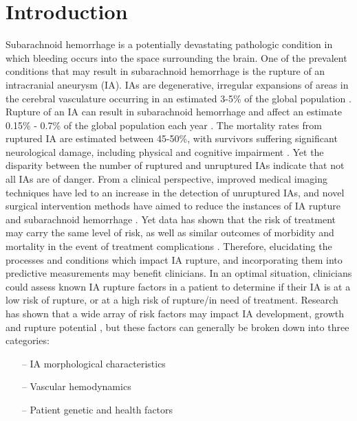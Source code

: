 \cleartooddpage[\thispagestyle{empty}]
\chapter{Introduction}\label{CHAPTER1}

Subarachnoid hemorrhage is a potentially devastating pathologic condition in which bleeding occurs into the space surrounding the brain. One of the prevalent conditions that may result in subarachnoid hemorrhage is the rupture of an intracranial aneurysm (IA). IAs are degenerative, irregular expansions of areas in the cerebral vasculature occurring in an estimated 3-5\% of the global population \cite{revilla2018prevalence,hackenberg2018unruptured,villablanca2013natural}. Rupture of an IA can result in subarachnoid hemorrhage and affect an estimate 0.15\% - 0.7\% of the global population each year \cite{hughes2018estimating}. The mortality rates from ruptured IA are estimated between 45-50\%, with survivors suffering significant neurological damage, including physical and cognitive impairment \cite{LONGO2017632,villablanca2013natural}. Yet the disparity between the number of ruptured and unruptured IAs indicate that not all IAs are of danger. 
	From a clinical perspective, improved medical imaging techniques have led to an increase in the detection of unruptured IAs, and novel surgical intervention methods have aimed to reduce the instances of IA rupture and subarachnoid hemorrhage \cite{molyneux2002international,komotar2008guidelines}. Yet data has shown that the risk of treatment may carry the same level of risk, as well as similar outcomes of morbidity and mortality in the event of treatment complications \cite{mascitelli2015predictors,liu2016recanalization,chalouhi2015safety}. Therefore, elucidating the processes and conditions which impact IA rupture, and incorporating them into predictive measurements may benefit clinicians. In an optimal situation, clinicians could assess known IA rupture factors in a patient to determine if their IA is at a low risk of rupture, or at a high risk of rupture/in need of treatment. Research has shown that a wide array of risk factors may impact IA development, growth and rupture potential \cite{Korja2014,penn2014role,starke2014tumor,diagbouga2018role}, but these factors can generally be broken down into three categories:
	\begin{itemize}
  		\item[--] IA morphological characteristics
 	    \item[--] Vascular hemodynamics
 	    \item[--] Patient genetic and health factors
	\end{itemize}

